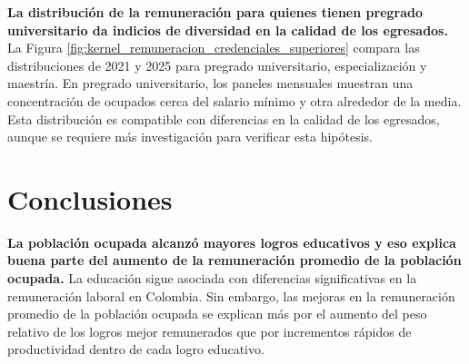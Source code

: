 \textbf{La distribución de la remuneración para quienes tienen pregrado universitario da indicios de diversidad en la calidad de los egresados.} La Figura \ref{fig:kernel_remuneracion_credenciales_superiores} compara las distribuciones de 2021 y 2025 para pregrado universitario, especialización y maestría. En pregrado universitario, los paneles mensuales muestran una concentración de ocupados cerca del salario mínimo y otra alrededor de la media. Esta distribución es compatible con diferencias en la calidad de los egresados, aunque se requiere más investigación para verificar esta hipótesis.


%


\section{Conclusiones}\label{sec:conclusiones}

\textbf{La población ocupada alcanzó mayores logros educativos y eso explica buena parte del aumento de la remuneración promedio de la población ocupada.} La educación sigue asociada con diferencias significativas en la remuneración laboral en Colombia. Sin embargo, las mejoras en la remuneración promedio de la población ocupada se explican más por el aumento del peso relativo de los logros mejor remunerados que por incrementos rápidos de productividad dentro de cada logro educativo.

